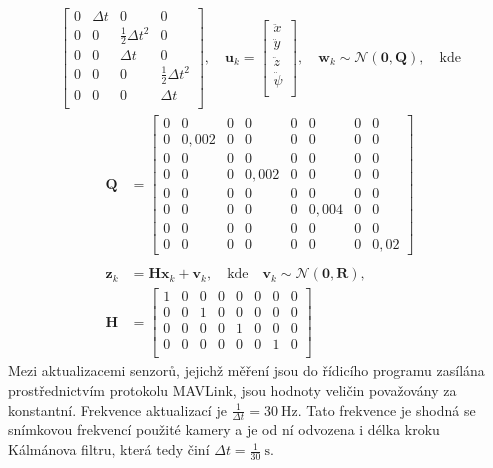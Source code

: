 \begin{align}
\begin{bmatrix}
                0 & \Delta t & 0 & 0 \\
                0 & 0 & \frac{1}{2}\Delta t^2 & 0 \\
                0 & 0 & \Delta t & 0 \\
                0 & 0 & 0 & \frac{1}{2}\Delta t^2 \\
                0 & 0 & 0 & \Delta t \\
            \end{bmatrix}, \quad \mathbf{u}_k = \begin{bmatrix}
                \ddot x \\
                \ddot y \\
                \ddot z~\\
                \ddot \psi \\
            \end{bmatrix}, \quad \mathbf{w}_k \sim \mathcal{N}(\mathbf{0},\mathbf{Q}),\quad\mathrm{kde}\nonumber\end{align}\begin{align}
            \mathbf{Q} &= \begin{bmatrix}
                0 & 0       & 0 & 0       & 0 & 0       & 0 & 0\\
                0 & 0{,}002 & 0 & 0       & 0 & 0       & 0 & 0\\
                0 & 0       & 0 & 0       & 0 & 0       & 0 & 0\\
                0 & 0       & 0 & 0{,}002 & 0 & 0       & 0 & 0\\
                0 & 0       & 0 & 0       & 0 & 0       & 0 & 0\\
                0 & 0       & 0 & 0       & 0 & 0{,}004 & 0 & 0\\
                0 & 0       & 0 & 0       & 0 & 0       & 0 & 0\\
                0 & 0       & 0 & 0       & 0 & 0       & 0 & 0{,}02
            \end{bmatrix} \nonumber \\ \nonumber \\
            \mathbf z_k &= \mathbf{Hx}_k + \mathbf{v}_k, \quad \mathrm{kde} \quad \mathbf{v}_k \sim \mathcal{N}(\mathbf{0},\mathbf{R}), \label{eq:kalmanz}\\
            \mathbf H &= \begin{bmatrix}
                1 & 0 & 0 & 0 & 0 & 0 & 0 & 0\\
                0 & 0 & 1 & 0 & 0 & 0 & 0 & 0\\
                0 & 0 & 0 & 0 & 1 & 0 & 0 & 0\\
                0 & 0 & 0 & 0 & 0 & 0 & 1 & 0\\
            \end{bmatrix} \nonumber
        \end{align}
        Mezi aktualizacemi senzorů, jejichž měření jsou do řídicího programu zasílána prostřednictvím protokolu MAVLink, jsou hodnoty veličin považovány za konstantní. Frekvence aktualizací je $\frac{1}{\Delta t} = 30~\mathrm{Hz}$. Tato frekvence je shodná se snímkovou frekvencí použité kamery a je od ní odvozena i délka kroku Kálmánova filtru, která tedy činí $\Delta t=\frac{1}{30}~\mathrm{s}$.
